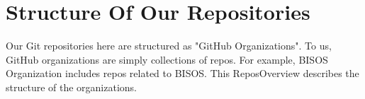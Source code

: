 \section{Structure Of Our Repositories}

Our Git repositories here are structured as "GitHub Organizations". To
us, GitHub organizations are simply collections of repos. For example,
BISOS Organization includes repos related to BISOS. This ReposOverview
describes the structure of the organizations.

\begin{comment}
*  [[elisp:(org-cycle)][| ]]  [[elisp:(blee:ppmm:org-mode-toggle)][Nat]] [[elisp:(beginning-of-buffer)][Top]] [[elisp:(delete-other-windows)][(1)]] || /Input/  [[elisp:(blee:file-goto-contents "./githubReport.tex")][Goto ./githubReport.tex]] ::  [[elisp:(org-cycle)][| ]]
\end{comment}





\begin{comment}
*  [[elisp:(org-cycle)][| ]]  [[elisp:(blee:ppmm:org-mode-toggle)][Nat]] [[elisp:(beginning-of-buffer)][Top]] [[elisp:(delete-other-windows)][(1)]] || /DBLOCK: *NO* Table Of Contents/  ::  [[elisp:(org-cycle)][| ]]
\end{comment}





\begin{comment}
*  [[elisp:(org-cycle)][| ]]  Local Vars  ::                  *Org-Mode And Emacs Specific Configurations*   [[elisp:(org-cycle)][| ]]
\end{comment}


\begin{comment}
*  [[elisp:(org-cycle)][| ]]  [[elisp:(blee:ppmm:org-mode-toggle)][Nat]] EndOfFileVars ::  *DBLK: Org-Mode And Emacs Specific Configurations*   [[elisp:(org-cycle)][| ]]
\end{comment}


